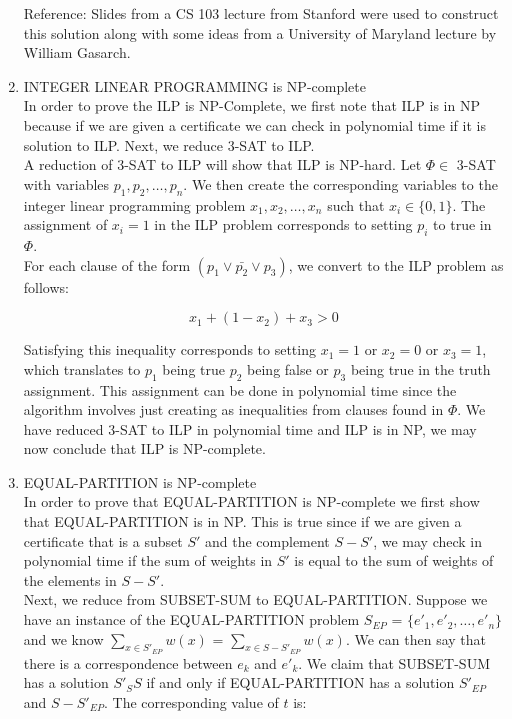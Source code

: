 \documentclass[]{report}
\begin{document}
\begin{enumerate}
	Reference: Slides from a CS 103 lecture from Stanford were used to construct this solution along with some ideas from a University of Maryland lecture  by William Gasarch. \\
		
	\item INTEGER LINEAR PROGRAMMING is NP-complete \\
	
	In order to prove the ILP is NP-Complete, we first note that ILP is in NP because if we are  given a certificate we can check in polynomial time if it is solution to ILP. Next, we reduce 3-SAT to ILP. \\
	
	A reduction of 3-SAT to ILP will show that ILP is NP-hard.  Let $\Phi \in$ 3-SAT with variables $p_1, p_2, \dots, p_n$. We then create the corresponding variables to the integer linear programming problem $x_1,x_2,\dots, x_n$ such that $x_{i} \in \{0,1\}$. The assignment of $x_i=1$ in the ILP problem corresponds to setting $p_i$ to true in $\Phi$. \\
	
	For each clause of the form $(p_1 \vee \bar{p_2} \vee p_3)$, we convert to the ILP problem as follows: 
	
	$$x_1 +(1-x_2) + x_3>0$$
	
	Satisfying this inequality corresponds to setting $x_1=1$ or $x_2=0$ or $x_3=1$, which translates to $p_1$ being true $p_2$ being false or $p_3$ being true in the truth assignment. This assignment can be done in polynomial time since the algorithm involves just creating as inequalities from clauses found in $\Phi$. We have reduced 3-SAT to ILP in polynomial time and ILP is in NP, we may now conclude that ILP is NP-complete. \\

	\item EQUAL-PARTITION is NP-complete \\		
	
	In order to prove that EQUAL-PARTITION is NP-complete we first show that EQUAL-PARTITION is in NP. This is true since if we are given a certificate that is a subset $S'$ and the complement $S -S'$, we may check in polynomial time if the sum of weights in $S'$ is equal to the sum of weights of the elements in $S -S'$. \\
	
	Next, we reduce from SUBSET-SUM to EQUAL-PARTITION. Suppose we have an instance of the EQUAL-PARTITION problem $S_{EP}$ = $\{ e'_1, e'_2, \dots, e'_n  \} $ and we know $ \sum_{x \in S'_{EP}} w(x)$ = $\sum_{x \in S - S'_{EP}} w(x)$. We can then say that there is a correspondence between $e_k$ and $e'_k$. We claim that SUBSET-SUM has a solution $S'_SS$ if and only if EQUAL-PARTITION has a solution $S'_{EP}$ and $S - S'_{EP}$. The corresponding value of $t$ is: 
	

\end{enumerate}
\end{document}
